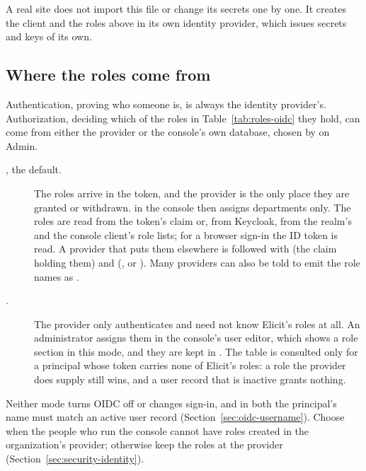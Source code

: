 \documentclass[11pt, a4paper]{article}
\begin{document}
A real site does not import this file or change its secrets one by one. It creates the client
and the roles above in its own identity provider, which issues secrets and keys of its own.

\subsection{Where the roles come from}
\label{sec:oidc-authorization}

Authentication, proving who someone is, is always the identity provider's. Authorization,
deciding which of the roles in Table~\ref{tab:roles-oidc} they hold, can come from either the
provider or the console's own database, chosen by  on Admin.

\begin{description}
  \item[, the default.] The roles arrive in the token, and the provider is the only
        place they are granted or withdrawn.  in the console then assigns
        departments only. The roles are read from the token's  claim or, from
        Keycloak, from the realm's and the console client's role lists; for a browser sign-in
        the ID token is read. A provider that puts them elsewhere is followed with
         (the claim holding them) and
         (,  or ).
        Many providers can also be told to emit the role names as .
  \item[.] The provider only authenticates and need not know Elicit's roles at
        all. An administrator assigns them in the console's user editor, which shows a role
        section in this mode, and they are kept in . The table is
        consulted only for a principal whose token carries none of Elicit's roles: a role the
        provider does supply still wins, and a user record that is inactive grants nothing.
\end{description}

Neither mode turns OIDC off or changes sign-in, and in both the principal's name must match an
active user record (Section~\ref{sec:oidc-username}). Choose  when the people who
run the console cannot have roles created in the organization's provider; otherwise keep the
roles at the provider (Section~\ref{sec:security-identity}).

\end{document}
